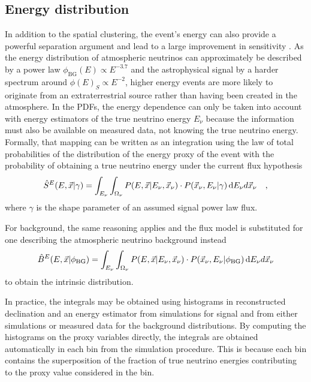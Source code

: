 \subsection{Energy distribution}
In addition to the spatial clustering, the event's energy can also provide a powerful separation argument and lead to a large improvement in sensitivity \cite{Braun:2008bg}.
As the energy distribution of atmospheric neutrinos can approximately be described by a power law $\phi_\mathrm{BG}(E) \propto E^{-3.7}$ and the astrophysical signal by a harder spectrum around $\phi(E)_S \propto E^{-2}$, higher energy events are more likely to originate from an extraterrestrial source rather than having been created in the atmosphere.
In the PDFs, the energy dependence can only be taken into account with energy estimators of the true neutrino energy $E_\nu$ because the information must also be available on measured data, not knowing the true neutrino energy.
Formally, that mapping can be written as an integration using the law of total probabilities of the distribution of the energy proxy of the event with the probability of obtaining a true neutrino energy under the current flux hypothesis
\begin{equation}
  \hat{S}^E(E, \vec{x}|\gamma) =
    \int_{E_\nu}\int_{\Omega_\nu}
    P(E, \vec{x}|E_\nu, \vec{x}_\nu) \cdot P(\vec{x}_\nu, E_\nu|\gamma)
    \,\mathrm{d}E_\nu d{\vec{x}_\nu}
    \quad\text{,}
\end{equation}
where $\gamma$ is the shape parameter of an assumed signal power law flux.

For background, the same reasoning applies and the flux model is substituted for one describing the atmospheric neutrino background instead
\begin{equation}
  \hat{B}^E(E, \vec{x}|\phi_\mathrm{BG}) =
    \int_{E_\nu}\int_{\Omega_\nu}
    P(E, \vec{x}|E_\nu, \vec{x}_\nu) \cdot P(\vec{x}_\nu, E_\nu|\phi_\mathrm{BG})
    \,\mathrm{d}E_\nu d{\vec{x}_\nu}
\end{equation}
to obtain the intrinsic distribution.

In practice, the integrals may be obtained using histograms in reconstructed declination and an energy estimator from simulations for signal and from either simulations or measured data for the background distributions.
By computing the histograms on the proxy variables directly, the integrals are obtained automatically in each bin from the simulation procedure.
This is because each bin contains the superposition of the fraction of true neutrino energies contributing to the proxy value considered in the bin.

